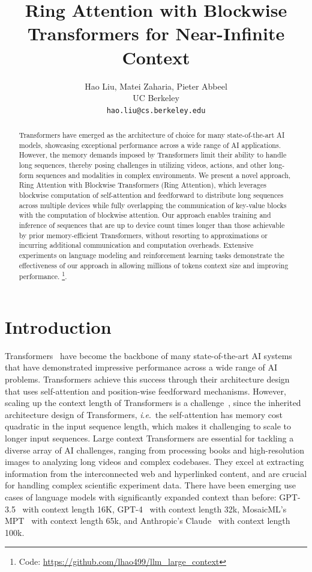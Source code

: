 \documentclass{article}
\title{Ring Attention with Blockwise \\ Transformers for Near-Infinite Context}
\author{%
Hao Liu,  Matei Zaharia,  Pieter Abbeel
\\[0.8ex]
UC Berkeley\\[0.2ex]
\texttt{\small{hao.liu@cs.berkeley.edu}}
}
\newcommand{\ie}{\textit{i}.\textit{e}.}
\begin{document}
\maketitle


\begin{abstract}
Transformers have emerged as the architecture of choice for many state-of-the-art AI models, showcasing exceptional performance across a wide range of AI applications. However, the memory demands imposed by Transformers limit their ability to handle long sequences, thereby posing challenges in utilizing videos, actions, and other long-form sequences and modalities in complex environments. We present a novel approach, Ring Attention with Blockwise Transformers (Ring Attention), which leverages blockwise computation of self-attention and feedforward to distribute long sequences across multiple devices while fully overlapping the communication of key-value blocks with the computation of blockwise attention. Our approach enables training and inference of sequences that are up to device count times longer than those achievable by prior memory-efficient Transformers, without resorting to approximations or incurring additional communication and computation overheads.
Extensive experiments on language modeling and reinforcement learning tasks demonstrate the effectiveness of our approach in allowing millions of tokens context size and improving performance.
\footnote{\scriptsize{Code: \url{https://github.com/lhao499/llm_large_context}}}.
\end{abstract}

\section{Introduction}
Transformers~\citep{vaswani2017attention} have become the backbone of many state-of-the-art AI systems that have demonstrated impressive performance across a wide range of AI problems.
Transformers achieve this success through their architecture design that uses self-attention and position-wise feedforward mechanisms.
However, scaling up the context length of Transformers is a challenge~\citep{openai2023gpt4}, since the inherited architecture design of Transformers, \ie~the self-attention has memory cost quadratic in the input sequence length,
which makes it challenging to scale to longer input sequences.
Large context Transformers are essential for
tackling a diverse array of AI challenges, ranging from processing books and high-resolution images to analyzing long videos and complex codebases.
They excel at extracting information from the interconnected web and hyperlinked content, and are crucial for handling complex scientific experiment data.
There have been emerging use cases of language models with significantly expanded context than before: GPT-3.5~\citep{schulman2022chatgpt} with context length 16K, GPT-4~\citep{openai2023gpt4} with context length 32k, MosaicML’s MPT~\citep{mosaicml-mpt-7b} with context length 65k, and Anthropic’s Claude~\citep{anthropic-claude} with context length 100k.
\end{document}
